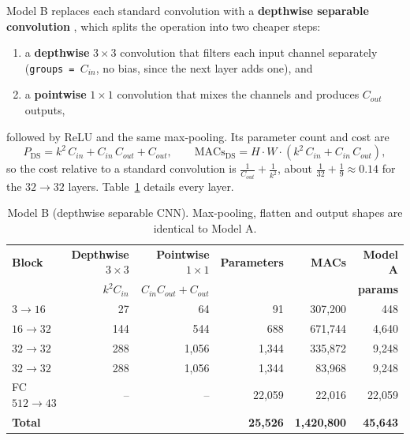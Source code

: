\documentclass[11pt, a4paper]{article}
\begin{document}
Model B replaces each standard convolution with a \textbf{depthwise separable convolution} \cite{mobilenetv1}, which
splits the operation into two cheaper steps:
\begin{enumerate}
    \item a \textbf{depthwise} $3 \times 3$ convolution that filters each input channel separately
          (\texttt{groups = $C_{in}$}, no bias, since the next layer adds one), and
    \item a \textbf{pointwise} $1 \times 1$ convolution that mixes the channels and produces $C_{out}$ outputs,
\end{enumerate}
followed by ReLU and the same max-pooling. Its parameter count and cost are
\begin{equation}
    P_{\text{DS}} = k^2 \, C_{in} + C_{in} \, C_{out} + C_{out}, \qquad
    \text{MACs}_{\text{DS}} = H \cdot W \cdot (k^2 \, C_{in} + C_{in} \, C_{out}),
\end{equation}
so the cost relative to a standard convolution is $\frac{1}{C_{out}} + \frac{1}{k^2}$, about $\frac{1}{32} + \frac{1}{9}
\approx 0.14$ for the $32 \to 32$ layers. Table~\ref{tab:modelB} details every layer.

\begin{table}[H]
\centering
\caption{Model B (depthwise separable CNN). Max-pooling, flatten and output shapes are identical to Model A.}
\label{tab:modelB}
\begin{tabular}{lrrrrr}
\toprule
\textbf{Block} & \textbf{Depthwise $3 \times 3$} & \textbf{Pointwise $1 \times 1$} & \textbf{Parameters} & \textbf{MACs} & \textbf{Model A} \\
               & $k^2 C_{in}$ & $C_{in} C_{out} + C_{out}$ & & & \textbf{params} \\
\midrule
$3 \rightarrow 16$   & 27  & 64    & 91     & 307,200   & 448 \\
$16 \rightarrow 32$  & 144 & 544   & 688    & 671,744   & 4,640 \\
$32 \rightarrow 32$  & 288 & 1,056 & 1,344  & 335,872   & 9,248 \\
$32 \rightarrow 32$  & 288 & 1,056 & 1,344  & 83,968    & 9,248 \\
FC $512 \rightarrow 43$ & -- & -- & 22,059 & 22,016    & 22,059 \\
\midrule
\textbf{Total} & & & \textbf{25,526} & \textbf{1,420,800} & \textbf{45,643} \\
\bottomrule
\end{tabular}
\end{table}
\end{document}
